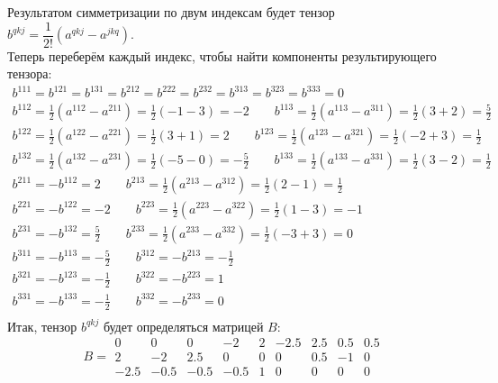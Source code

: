 \documentclass{article}
\begin{document}
\begin{center}
Результатом симметризации по двум индексам будет тензор $b^{qkj} = \dfrac{1}{2!}\left (a^{qkj} - a^{jkq}\right )$. \\
Теперь переберём каждый индекс, чтобы найти компоненты результирующего тензора:
\begin{gather*}
b^{111} = b^{121} = b^{131} = b^{212} = b^{222} = b^{232} = b^{313} = b^{323} = b^{333} = 0 \\
b^{112} = \frac{1}{2}\left(a^{112} - a^{211}\right) = \frac{1}{2}(-1 - 3) = -2 \qquad b^{113} = \frac{1}{2}\left(a^{113} - a^{311}\right) = \frac{1}{2}(3 + 2) = \frac{5}{2}\\
b^{122} = \frac{1}{2}\left(a^{122} - a^{221}\right) = \frac{1}{2}(3 + 1) = 2 \qquad b^{123} = \frac{1}{2}\left(a^{123} - a^{321}\right) = \frac{1}{2}(-2 + 3) = \frac{1}{2}\\
b^{132} = \frac{1}{2}\left(a^{132} - a^{231}\right) = \frac{1}{2}(-5 - 0) = -\frac{5}{2} \qquad b^{133} = \frac{1}{2}\left(a^{133} - a^{331}\right) = \frac{1}{2}(3 - 2) = \frac{1}{2}\\
b^{211} = -b^{112} = 2 \qquad b^{213} = \frac{1}{2}\left(a^{213} - a^{312}\right) = \frac{1}{2}(2 - 1) = \frac{1}{2}\\
b^{221} = -b^{122} = -2 \qquad b^{223} = \frac{1}{2}\left(a^{223} - a^{322}\right) = \frac{1}{2}(1 - 3) = -1\\
b^{231} = -b^{132} = \frac{5}{2} \qquad b^{233} = \frac{1}{2}\left(a^{233} - a^{332}\right) = \frac{1}{2}(-3 + 3) = 0\\
b^{311} = -b^{113} = -\frac{5}{2} \qquad b^{312} = -b^{213} = -\frac{1}{2}\\
b^{321} = -b^{123} = -\frac{1}{2} \qquad b^{322} = -b^{223} = 1\\
b^{331} = -b^{133} = -\frac{1}{2} \qquad b^{332} = -b^{233} = 0\\
\end{gather*}
Итак, тензор $b^{qkj}$ будет определяться матрицей $B$:
$$B = \begin{array}{||ccc|ccc|ccc||}
0 & 0 & 0 & -2 & 2 & -2.5 & 2.5 & 0.5 & 0.5\\
2 & -2 & 2.5 & 0 & 0 & 0 & 0.5 & -1 & 0\\
-2.5 & -0.5 & -0.5 & -0.5 & 1 & 0 & 0 & 0 & 0
\end{array}$$
\end{center}
\end{document}
